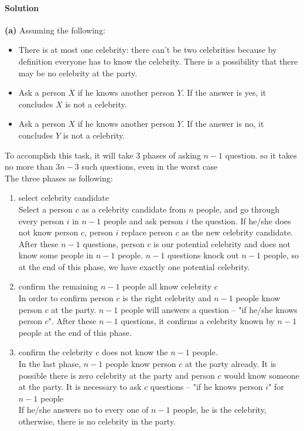 \documentclass[a4paper]{scrartcl}
\begin{document}
\paragraph{Solution}
{\bfseries(a)}
Assuming the following:
\begin{itemize}
  \item There is at most one celebrity: there can't be two celebrities because by definition everyone has to know the celebrity. There is a possibility that there may be no celebrity at the party.
  \item Ask a person $X$ if he knows another person $Y$. If the answer is yes, it concludes $X$ is not a celebrity.
  \item Ask a person $X$ if he knows another person $Y$. If the answer is no, it concludes $Y$ is not a celebrity.
\end{itemize}
To accomplish this task, it will take 3 phases of asking $n-1$ question. so it takes no more than $3n-3$ such questions, even in the worst case\\ 
The three phases as following:
\begin{enumerate}
  \item select celebrity candidate\\
  Select a person $c$ as a celebrity candidate from $n$ people, and go through every person $i$ in $n-1$ people and ask person $i$ the question. If he/she does not know person $c$, person $i$ replace person $c$ as the new celebrity candidate. After these $n-1$ questions, person $c$ is our potential celebrity and does not know some people in $n-1$ people. $n-1$ questions knock out $n-1$ people, so at the end of this phase, we have exactly one potential celebrity. 
  \item confirm the remaining $n-1$ people all know celebrity $c$\\
  In order to confirm person $c$ is the right celebrity and $n-1$ people know person $c$ at the party. $n-1$ people will answers a question -- "if he/she knows person $c$". After these $n-1$ questions, it confirms a celebrity known by $n-1$ people at the end of this phase.
  \item confirm the celebrity $c$ does not know the $n-1$ people.\\
  In the last phase, $n-1$ people know person $c$ at the party already. It is possible there is zero celebrity at the party and person $c$ would know someone at the party. It is necessary to ask $c$ questions -- "if he knows person $i$" for $n-1$ people\\
  If he/she answers no to every one of $n-1$ people, he is the  celebrity, otherwise, there is no celebrity in the party.
\end{enumerate}
\end{document}
